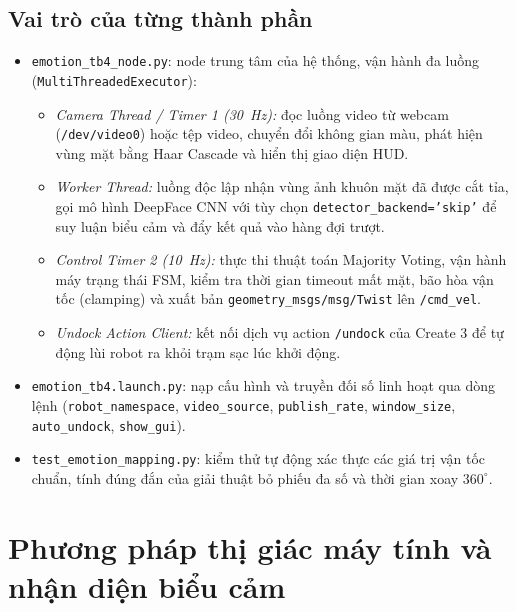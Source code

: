 \subsection{Vai trò của từng thành phần}
\begin{itemize}
    \item \texttt{emotion\_tb4\_node.py}: node trung tâm của hệ thống, vận hành đa luồng (\texttt{MultiThreadedExecutor}):
    \begin{itemize}
        \item \textit{Camera Thread / Timer 1 (\SI{30}{\hertz}):} đọc luồng video từ webcam (\texttt{/dev/video0}) hoặc tệp video, chuyển đổi không gian màu, phát hiện vùng mặt bằng Haar Cascade và hiển thị giao diện HUD.
        \item \textit{Worker Thread:} luồng độc lập nhận vùng ảnh khuôn mặt đã được cắt tỉa, gọi mô hình DeepFace CNN với tùy chọn \texttt{detector\_backend='skip'} để suy luận biểu cảm và đẩy kết quả vào hàng đợi trượt.
        \item \textit{Control Timer 2 (\SI{10}{\hertz}):} thực thi thuật toán Majority Voting, vận hành máy trạng thái FSM, kiểm tra thời gian timeout mất mặt, bão hòa vận tốc (clamping) và xuất bản \texttt{geometry\_msgs/msg/Twist} lên \texttt{/cmd\_vel}.
        \item \textit{Undock Action Client:} kết nối dịch vụ action \texttt{/undock} của Create 3 để tự động lùi robot ra khỏi trạm sạc lúc khởi động.
    \end{itemize}
    \item \texttt{emotion\_tb4.launch.py}: nạp cấu hình và truyền đối số linh hoạt qua dòng lệnh (\texttt{robot\_namespace}, \texttt{video\_source}, \texttt{publish\_rate}, \texttt{window\_size}, \texttt{auto\_undock}, \texttt{show\_gui}).
    \item \texttt{test\_emotion\_mapping.py}: kiểm thử tự động xác thực các giá trị vận tốc chuẩn, tính đúng đắn của giải thuật bỏ phiếu đa số và thời gian xoay $360^\circ$.
\end{itemize}

\section{Phương pháp thị giác máy tính và nhận diện biểu cảm}

